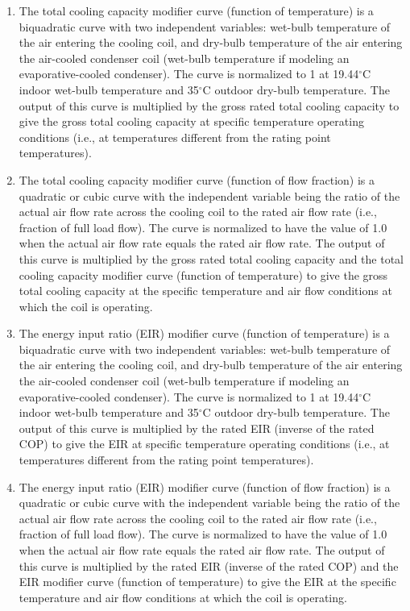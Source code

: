 \begin{enumerate}
\def\labelenumi{\arabic{enumi}.}
\item
  The total cooling capacity modifier curve (function of temperature) is a biquadratic curve with two independent variables: wet-bulb temperature of the air entering the cooling coil, and dry-bulb temperature of the air entering the air-cooled condenser coil (wet-bulb temperature if modeling an evaporative-cooled condenser). The curve is normalized to 1 at 19.44$^\circ$C indoor wet-bulb temperature and 35$^\circ$C outdoor dry-bulb temperature. The output of this curve is multiplied by the gross rated total cooling capacity to give the gross total cooling capacity at specific temperature operating conditions (i.e., at temperatures different from the rating point temperatures).
\item
  The total cooling capacity modifier curve (function of flow fraction) is a quadratic or cubic curve with the independent variable being the ratio of the actual air flow rate across the cooling coil to the rated air flow rate (i.e., fraction of full load flow). The curve is normalized to have the value of 1.0 when the actual air flow rate equals the rated air flow rate. The output of this curve is multiplied by the gross rated total cooling capacity and the total cooling capacity modifier curve (function of temperature) to give the gross total cooling capacity at the specific temperature and air flow conditions at which the coil is operating.
\item
  The energy input ratio (EIR) modifier curve (function of temperature) is a biquadratic curve with two independent variables: wet-bulb temperature of the air entering the cooling coil, and dry-bulb temperature of the air entering the air-cooled condenser coil (wet-bulb temperature if modeling an evaporative-cooled condenser). The curve is normalized to 1 at 19.44$^\circ$C indoor wet-bulb temperature and 35$^\circ$C outdoor dry-bulb temperature. The output of this curve is multiplied by the rated EIR (inverse of the rated COP) to give the EIR at specific temperature operating conditions (i.e., at temperatures different from the rating point temperatures).
\item
  The energy input ratio (EIR) modifier curve (function of flow fraction) is a quadratic or cubic curve with the independent variable being the ratio of the actual air flow rate across the cooling coil to the rated air flow rate (i.e., fraction of full load flow). The curve is normalized to have the value of 1.0 when the actual air flow rate equals the rated air flow rate. The output of this curve is multiplied by the rated EIR (inverse of the rated COP) and the EIR modifier curve (function of temperature) to give the EIR at the specific temperature and air flow conditions at which the coil is operating.

\end{enumerate}
